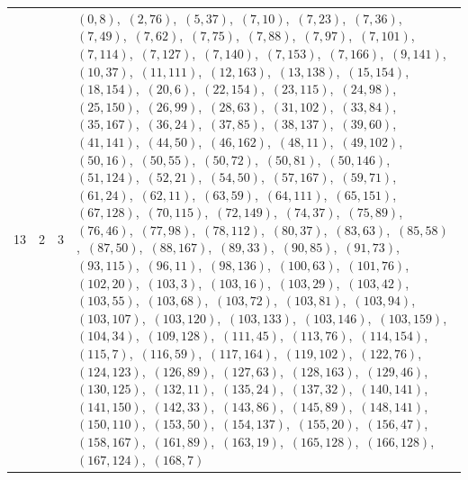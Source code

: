 \documentclass[11pt]{article}
\begin{document}
\begin{longtable}{@{}rrl>{\raggedright\arraybackslash}p{}@{}}
13 & 2 & $3$ & $(0,8)$,\allowbreak\ $(2,76)$,\allowbreak\ $(5,37)$,\allowbreak\ $(7,10)$,\allowbreak\ $(7,23)$,\allowbreak\ $(7,36)$,\allowbreak\ $(7,49)$,\allowbreak\ $(7,62)$,\allowbreak\ $(7,75)$,\allowbreak\ $(7,88)$,\allowbreak\ $(7,97)$,\allowbreak\ $(7,101)$,\allowbreak\ $(7,114)$,\allowbreak\ $(7,127)$,\allowbreak\ $(7,140)$,\allowbreak\ $(7,153)$,\allowbreak\ $(7,166)$,\allowbreak\ $(9,141)$,\allowbreak\ $(10,37)$,\allowbreak\ $(11,111)$,\allowbreak\ $(12,163)$,\allowbreak\ $(13,138)$,\allowbreak\ $(15,154)$,\allowbreak\ $(18,154)$,\allowbreak\ $(20,6)$,\allowbreak\ $(22,154)$,\allowbreak\ $(23,115)$,\allowbreak\ $(24,98)$,\allowbreak\ $(25,150)$,\allowbreak\ $(26,99)$,\allowbreak\ $(28,63)$,\allowbreak\ $(31,102)$,\allowbreak\ $(33,84)$,\allowbreak\ $(35,167)$,\allowbreak\ $(36,24)$,\allowbreak\ $(37,85)$,\allowbreak\ $(38,137)$,\allowbreak\ $(39,60)$,\allowbreak\ $(41,141)$,\allowbreak\ $(44,50)$,\allowbreak\ $(46,162)$,\allowbreak\ $(48,11)$,\allowbreak\ $(49,102)$,\allowbreak\ $(50,16)$,\allowbreak\ $(50,55)$,\allowbreak\ $(50,72)$,\allowbreak\ $(50,81)$,\allowbreak\ $(50,146)$,\allowbreak\ $(51,124)$,\allowbreak\ $(52,21)$,\allowbreak\ $(54,50)$,\allowbreak\ $(57,167)$,\allowbreak\ $(59,71)$,\allowbreak\ $(61,24)$,\allowbreak\ $(62,11)$,\allowbreak\ $(63,59)$,\allowbreak\ $(64,111)$,\allowbreak\ $(65,151)$,\allowbreak\ $(67,128)$,\allowbreak\ $(70,115)$,\allowbreak\ $(72,149)$,\allowbreak\ $(74,37)$,\allowbreak\ $(75,89)$,\allowbreak\ $(76,46)$,\allowbreak\ $(77,98)$,\allowbreak\ $(78,112)$,\allowbreak\ $(80,37)$,\allowbreak\ $(83,63)$,\allowbreak\ $(85,58)$,\allowbreak\ $(87,50)$,\allowbreak\ $(88,167)$,\allowbreak\ $(89,33)$,\allowbreak\ $(90,85)$,\allowbreak\ $(91,73)$,\allowbreak\ $(93,115)$,\allowbreak\ $(96,11)$,\allowbreak\ $(98,136)$,\allowbreak\ $(100,63)$,\allowbreak\ $(101,76)$,\allowbreak\ $(102,20)$,\allowbreak\ $(103,3)$,\allowbreak\ $(103,16)$,\allowbreak\ $(103,29)$,\allowbreak\ $(103,42)$,\allowbreak\ $(103,55)$,\allowbreak\ $(103,68)$,\allowbreak\ $(103,72)$,\allowbreak\ $(103,81)$,\allowbreak\ $(103,94)$,\allowbreak\ $(103,107)$,\allowbreak\ $(103,120)$,\allowbreak\ $(103,133)$,\allowbreak\ $(103,146)$,\allowbreak\ $(103,159)$,\allowbreak\ $(104,34)$,\allowbreak\ $(109,128)$,\allowbreak\ $(111,45)$,\allowbreak\ $(113,76)$,\allowbreak\ $(114,154)$,\allowbreak\ $(115,7)$,\allowbreak\ $(116,59)$,\allowbreak\ $(117,164)$,\allowbreak\ $(119,102)$,\allowbreak\ $(122,76)$,\allowbreak\ $(124,123)$,\allowbreak\ $(126,89)$,\allowbreak\ $(127,63)$,\allowbreak\ $(128,163)$,\allowbreak\ $(129,46)$,\allowbreak\ $(130,125)$,\allowbreak\ $(132,11)$,\allowbreak\ $(135,24)$,\allowbreak\ $(137,32)$,\allowbreak\ $(140,141)$,\allowbreak\ $(141,150)$,\allowbreak\ $(142,33)$,\allowbreak\ $(143,86)$,\allowbreak\ $(145,89)$,\allowbreak\ $(148,141)$,\allowbreak\ $(150,110)$,\allowbreak\ $(153,50)$,\allowbreak\ $(154,137)$,\allowbreak\ $(155,20)$,\allowbreak\ $(156,47)$,\allowbreak\ $(158,167)$,\allowbreak\ $(161,89)$,\allowbreak\ $(163,19)$,\allowbreak\ $(165,128)$,\allowbreak\ $(166,128)$,\allowbreak\ $(167,124)$,\allowbreak\ $(168,7)$\\

\end{longtable}
\end{document}
